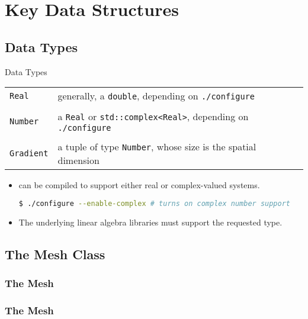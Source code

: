\section{Key Data Structures}

\subsection{Data Types}
\begin{frame}[fragile]
  \begin{block}{Data Types}
    \begin{center}
      \scriptsize
      \begin{tabular}{|l|l|} \hline
        \texttt{Real} & generally, a \texttt{double}, depending on \texttt{./configure} \\
                      & \\
        \texttt{Number} & a \texttt{Real} or \texttt{std::complex<Real>}, depending on \texttt{./configure} \\ 
                      & \\
        \texttt{Gradient} & a tuple of type \texttt{Number}, whose size is the spatial dimension \\ \hline
      \end{tabular}
    \end{center}
  \end{block}
  \begin{itemize}
  \item \libMesh{} can be compiled to support either real or complex-valued systems.
    \begin{lstlisting}[language=bash]
  $ ./configure --enable-complex # turns on complex number support
    \end{lstlisting}
  \item The underlying linear algebra libraries must support the requested type.
  \end{itemize}
\end{frame}

\subsection{The Mesh Class}
\begin{frame}[shrink]
  \frametitle{The Mesh}
  
\end{frame}

\begin{frame}[shrink]
  \frametitle{The Mesh}
  
\end{frame}

